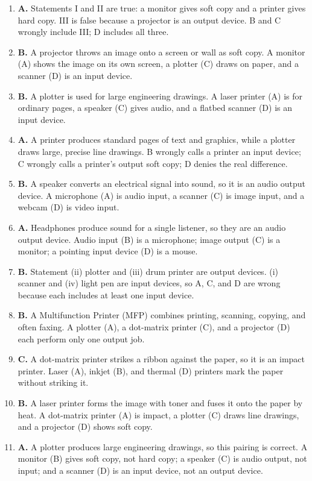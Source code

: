 \begin{enumerate}[label=\textbf{Q\arabic*.}, leftmargin=*]
\item \textbf{A.} Statements I and II are true: a monitor gives soft copy and
  a printer gives hard copy. III is false because a projector is an output
  device. B and C wrongly include III; D includes all three.
\item \textbf{B.} A projector throws an image onto a screen or wall as soft
  copy. A monitor (A) shows the image on its own screen, a plotter (C) draws
  on paper, and a scanner (D) is an input device.
\item \textbf{B.} A plotter is used for large engineering drawings. A laser
  printer (A) is for ordinary pages, a speaker (C) gives audio, and a flatbed
  scanner (D) is an input device.
\item \textbf{A.} A printer produces standard pages of text and graphics,
  while a plotter draws large, precise line drawings. B wrongly calls a
  printer an input device; C wrongly calls a printer's output soft copy; D
  denies the real difference.
\item \textbf{B.} A speaker converts an electrical signal into sound, so it is
  an audio output device. A microphone (A) is audio input, a scanner (C) is
  image input, and a webcam (D) is video input.
\item \textbf{A.} Headphones produce sound for a single listener, so they are
  an audio output device. Audio input (B) is a microphone; image output (C) is
  a monitor; a pointing input device (D) is a mouse.
\item \textbf{B.} Statement (ii) plotter and (iii) drum printer are output
  devices. (i) scanner and (iv) light pen are input devices, so A, C, and D
  are wrong because each includes at least one input device.
\item \textbf{B.} A Multifunction Printer (MFP) combines printing, scanning,
  copying, and often faxing. A plotter (A), a dot-matrix printer (C), and a
  projector (D) each perform only one output job.
\item \textbf{C.} A dot-matrix printer strikes a ribbon against the paper, so
  it is an impact printer. Laser (A), inkjet (B), and thermal (D) printers
  mark the paper without striking it.
\item \textbf{B.} A laser printer forms the image with toner and fuses it onto
  the paper by heat. A dot-matrix printer (A) is impact, a plotter (C) draws
  line drawings, and a projector (D) shows soft copy.
\item \textbf{A.} A plotter produces large engineering drawings, so this
  pairing is correct. A monitor (B) gives soft copy, not hard copy; a speaker
  (C) is audio output, not input; and a scanner (D) is an input device, not an
  output device.


\end{enumerate}
